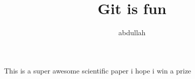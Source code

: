 \documentclass[10pt]{article}
\author{abdullah}
\title{Git is fun}
\begin{document}
	\maketitle

	This is a super awesome scientific paper
	i hope i win a prize
\end{document}
